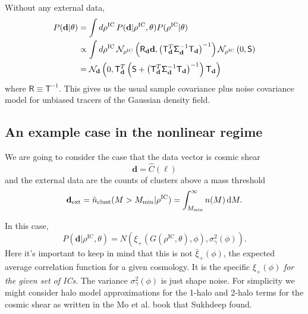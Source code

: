 \documentclass[preprint]{aastex}
\newcommand{\half}{\frac{1}{2}}
\newcommand{\data}{\mathbf{d}}
\newcommand{\dataext}{\data_{\rm ext}}
\newcommand{\rhoic}{\rho^{\rm IC}}
\newcommand{\normdist}{\mathcal{N}}
\newcommand{\smat}{\mathsf{S}}
\newcommand{\noisemat}{\mathsf{\Sigma}}
\newcommand{\transfer}{\mathsf{T}}
\newcommand{\invtransfer}{\mathsf{R}}
\begin{document}
Without any external data,
\begin{align}
	P(\data|\theta) &= 
	\int d\rhoic\, P(\data | \rhoic,\theta) P(\rhoic|\theta)
	\notag\\
	&\propto \int d\rhoic\, 
	\normdist_{\rhoic} \left(
	\invtransfer_{\data} \data,
	\left(\transfer_{\data}^{T} \noisemat_{\data}^{-1} \transfer_{\data}\right)^{-1}
	\right)
	\normdist_{\rhoic} \left(
	0, \smat
	\right)
	\notag\\
	&= \normdist_{\data} \left(
	0,
	\transfer^{T}_{\data}
	\left(
	\smat +
	\left(\transfer_{\data}^{T} \noisemat_{\data}^{-1} \transfer_{\data}\right)^{-1}
	\right)
	\transfer_{\data}
	\right)
\end{align}
where $\invtransfer \equiv \transfer^{-1}$.
This gives us the usual sample covariance plus noise covariance model for unbiased 
tracers of the Gaussian density field.

\subsection{An example case in the nonlinear regime}

We are going to consider the case that the data vector is cosmic shear
\begin{equation}
	\data = \hat{C}(\ell)
\end{equation}
and the external data are the counts of clusters above a mass threshold
\begin{equation}
	\dataext = \hat{n}_\text{clust}(M>M_\text{min} | \rho^\text{IC}) =
	\int_{M_\text{min}}^{\infty} n(M)\,\mathrm{d}M.
\end{equation}

In this case,
\begin{equation}
	P(\data|\rho^\text{IC},\theta) = N(\xi_+(G(\rho^\text{IC},\theta), \phi), \sigma^2_\gamma(\phi)).
\end{equation}
Here it's important to keep in mind that this is not $\bar{\xi}_+(\phi)$, the expected average correlation
function for a given cosmology.  It is the specific $\xi_+(\phi)$ {\em for the given set of ICs}. The
variance $\sigma^2_\gamma(\phi)$ is just shape noise.  For simplicity we might consider halo model
approximations for the 1-halo and 2-halo terms for the cosmic shear as written in the Mo et al. book
that Sukhdeep found.  
\end{document}
